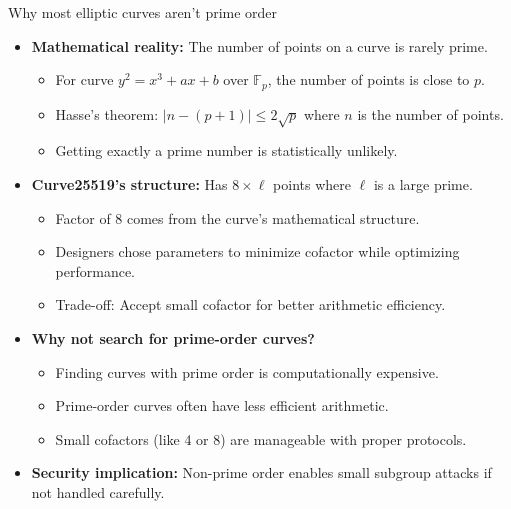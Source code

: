 \documentclass[aspectratio=169, lualatex, handout]{beamer}
\begin{document}
\begin{frame}{Why most elliptic curves aren't prime order}
	\begin{itemize}[<+->]
		\item \textbf{Mathematical reality:} The number of points on a curve is rarely prime.
		      \begin{itemize}
			      \item For curve $y^2 = x^3 + ax + b$ over $\mathbb{F}_p$, the number of points is close to $p$.
			      \item Hasse's theorem: $|n - (p + 1)| \leq 2\sqrt{p}$ where $n$ is the number of points.
			      \item Getting exactly a prime number is statistically unlikely.
		      \end{itemize}
		\item \textbf{Curve25519's structure:} Has $8 \times \ell$ points where $\ell$ is a large prime.
		      \begin{itemize}
			      \item Factor of 8 comes from the curve's mathematical structure.
			      \item Designers chose parameters to minimize cofactor while optimizing performance.
			      \item Trade-off: Accept small cofactor for better arithmetic efficiency.
		      \end{itemize}
		\item \textbf{Why not search for prime-order curves?}
		      \begin{itemize}
			      \item Finding curves with prime order is computationally expensive.
			      \item Prime-order curves often have less efficient arithmetic.
			      \item Small cofactors (like 4 or 8) are manageable with proper protocols.
		      \end{itemize}
		\item \textbf{Security implication:} Non-prime order enables small subgroup attacks if not handled carefully.
	\end{itemize}
\end{frame}
\end{document}
